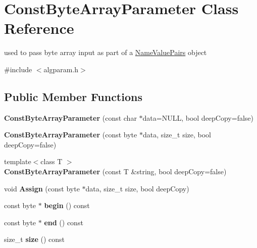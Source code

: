 \hypertarget{class_const_byte_array_parameter}{
\section{ConstByteArrayParameter Class Reference}
\label{class_const_byte_array_parameter}
}


used to pass byte array input as part of a \hyperlink{class_name_value_pairs}{NameValuePairs} object  


{\ttfamily \#include $<$algparam.h$>$}\subsection*{Public Member Functions}
\begin{DoxyCompactItemize}
\item 
\hypertarget{class_const_byte_array_parameter_ad6c1c0a4a2946b3f78d5c8b85e753900}{
{\bfseries ConstByteArrayParameter} (const char $\ast$data=NULL, bool deepCopy=false)}
\label{class_const_byte_array_parameter_ad6c1c0a4a2946b3f78d5c8b85e753900}

\item 
\hypertarget{class_const_byte_array_parameter_a86cc3bd13ef260ece6d8353edc69cc87}{
{\bfseries ConstByteArrayParameter} (const byte $\ast$data, size\_\-t size, bool deepCopy=false)}
\label{class_const_byte_array_parameter_a86cc3bd13ef260ece6d8353edc69cc87}

\item 
\hypertarget{class_const_byte_array_parameter_ab96e8b5d682badba1d2e343942fa2f2f}{
{\footnotesize template$<$class T $>$ }\\{\bfseries ConstByteArrayParameter} (const T \&string, bool deepCopy=false)}
\label{class_const_byte_array_parameter_ab96e8b5d682badba1d2e343942fa2f2f}

\item 
\hypertarget{class_const_byte_array_parameter_af3b75a9fc1026ede6b976822f9f7e349}{
void {\bfseries Assign} (const byte $\ast$data, size\_\-t size, bool deepCopy)}
\label{class_const_byte_array_parameter_af3b75a9fc1026ede6b976822f9f7e349}

\item 
\hypertarget{class_const_byte_array_parameter_a1413518a64bf122f68706cc15cd0776b}{
const byte $\ast$ {\bfseries begin} () const }
\label{class_const_byte_array_parameter_a1413518a64bf122f68706cc15cd0776b}

\item 
\hypertarget{class_const_byte_array_parameter_a73aca30b50c462e3148126278d21bf1a}{
const byte $\ast$ {\bfseries end} () const }
\label{class_const_byte_array_parameter_a73aca30b50c462e3148126278d21bf1a}

\item 
\hypertarget{class_const_byte_array_parameter_a041f635e7868db773a28669fe1a5dcfe}{
size\_\-t {\bfseries size} () const }
\label{class_const_byte_array_parameter_a041f635e7868db773a28669fe1a5dcfe}

\end{DoxyCompactItemize}


